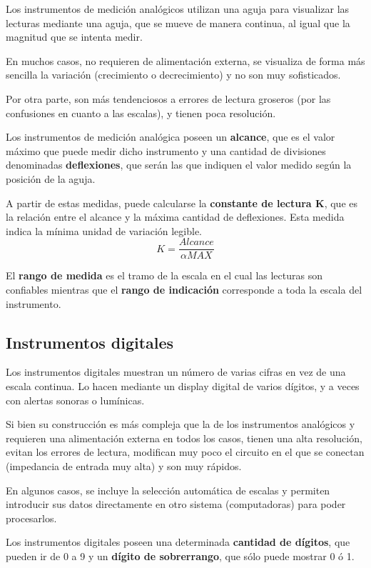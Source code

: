 Los instrumentos de medición analógicos utilizan una aguja para visualizar las lecturas mediante una aguja, que se mueve de manera continua, al igual que la magnitud que se intenta medir.

En muchos casos, no requieren de alimentación externa, se visualiza de forma más sencilla la variación (crecimiento o decrecimiento) y no son muy sofisticados. 

Por otra parte, son más tendenciosos a errores de lectura groseros (por las confusiones en cuanto a las escalas), y tienen poca resolución.

Los instrumentos de medición analógica poseen un \textbf{alcance}, que es el valor máximo que puede medir dicho instrumento y una cantidad de divisiones denominadas \textbf{deflexiones}, que serán las que indiquen el valor medido según la posición de la aguja.

A partir de estas medidas, puede calcularse la \textbf{constante de lectura K}, que es la relación entre el alcance y la máxima cantidad de deflexiones. Esta medida indica la mínima unidad de variación legible.
$$ K = \frac{Alcance}{\alpha MAX} $$

El \textbf{rango de medida} es el tramo de la escala en el cual las lecturas son confiables mientras que el \textbf{rango de indicación} corresponde a toda la escala del instrumento.

\subsection{Instrumentos digitales}
	
Los instrumentos digitales muestran un número de varias cifras en vez de una escala continua. Lo hacen mediante un display digital de varios dígitos, y a veces con alertas sonoras o lumínicas.

Si bien su construcción es más compleja que la de los instrumentos analógicos y requieren una alimentación externa en todos los casos, tienen una alta resolución, evitan los errores de lectura, modifican muy poco el circuito en el que se conectan (impedancia de entrada muy alta) y son muy rápidos.

En algunos casos, se incluye la selección automática de escalas y permiten introducir sus datos directamente en otro sistema (computadoras) para poder procesarlos.

Los instrumentos digitales poseen una determinada \textbf{cantidad de dígitos}, que pueden ir de 0 a 9 y un \textbf{dígito de sobrerrango}, que sólo puede mostrar 0 ó 1.

